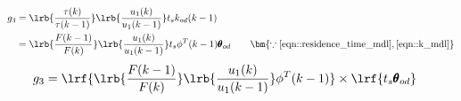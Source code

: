 \begin{align*}
        g_3 &= \lrb{\frac{\tau(k)}{\tau(k-1)}}
                                \lrb{\frac{u_1(k)}{u_1(k-1)}}
                t_s k_{od}(k-1)\\
                &= \lrb{\frac{F(k-1)}{F(k)}}
                                \lrb{\frac{u_1(k)}{u_1(k-1)}}
                t_s \phi^T(k-1) \pmb \theta_{od}
                \qquad \bm{\because \ref{eqn::residence_time_mdl}, \ref{eqn::k_mdl}}
\end{align*}
\begin{align}
        g_3 &= \lrf{ \lrb{\frac{F(k-1)}{F(k)}} \lrb{\frac{u_1(k)}{u_1(k-1)}} \phi^T(k-1) }
                \times \lrf{t_s \pmb \theta_{od}}
\end{align}
